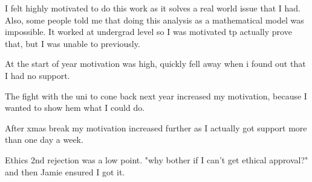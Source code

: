 I felt highly motivated to do this work as it solves a real world issue that I had. Also, some people told me that doing this analysis as a mathematical model was impossible. It worked at undergrad level so I was motivated tp actually prove that, but I was unable to previously.

At the start of year motivation was high, quickly fell away when i found out that I had no support.

The fight with the uni to cone back next year increased my motivation, because I wanted to show hem what I could do.

After xmas break my motivation increased further as I actually got support more than one day a week.

Ethics 2nd rejection was a low point. "why bother if I can't get ethical approval?" and then Jamie ensured I got it.

